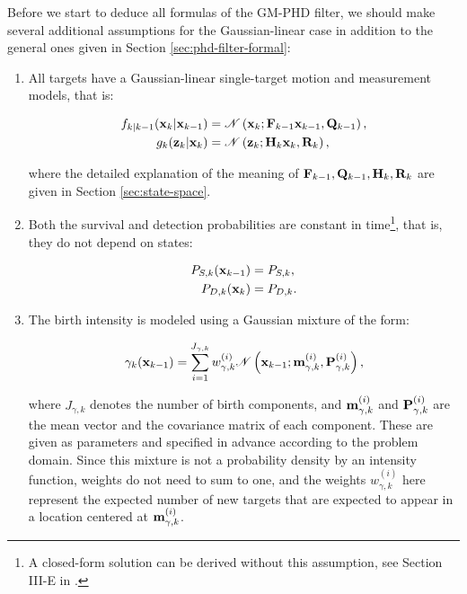 Before we start to deduce all formulas of the GM-PHD filter, we should make several additional assumptions for the Gaussian-linear case in addition to the general ones given in Section \ref{sec:phd-filter-formal}:

\begin{enumerate}
    \item All targets have a Gaussian-linear single-target motion and measurement models, that is:

    \begin{align}
        f_{k|k-1}(\vecat{x}{k} | \vecat{x}{k-1}) &= \mathscr{N}\left(\vecat{x}{k}; \vecat{F}{k-1} \vecat{x}{k-1}, \vecat{Q}{k-1}\right), \\
        g_{k}(\vecat{z}{k} | \vecat{x}{k}) &= \mathscr{N}\left(\vecat{z}{k}; \vecat{H}{k}\vecat{x}{k}, \vecat{R}{k}\right),
    \end{align}

    \noindent where the detailed explanation of the meaning of $\vecat{F}{k-1}, \vecat{Q}{k-1}, \vecat{H}{k}, \vecat{R}{k}$ are given in Section \ref{sec:state-space}.
    
    \item Both the survival and detection probabilities are constant in time\footnote{A closed-form solution can be derived without this assumption, see Section III-E in \cite{voGaussianMixtureProbability2006}.}, that is, they do not depend on states:

    \begin{align}
        P_{S, k}(\vecat{x}{k-1}) &= P_{S, k},\\
        P_{D, k}(\vecat{x}{k}) &= P_{D, k}.
    \end{align}

    \item The birth intensity is modeled using a Gaussian mixture of the form:

    \begin{equation}\label{eq:gm-phd-birth-gm}
        \gamma_k(\vecat{x}{k-1}) = \sum_{i=1}^{J_{\gamma, k}} w_{\gamma, k}^{(i)}
        \mathscr{N}\left(\vecat{x}{k-1}; \vecat{m}{\gamma, k}^{(i)}, \vecat{P}{\gamma, k}^{(i)}\right),
    \end{equation}

    \noindent where $J_{\gamma, k}$ denotes the number of birth components, and $\vecat{m}{\gamma, k}^{(i)}$ and $\vecat{P}{\gamma, k}^{(i)}$ are the mean vector and the covariance matrix of each component. These are given as parameters and specified in advance according to the problem domain. Since this mixture is not a probability density by an intensity function, weights do not need to sum to one, and the weights $w_{\gamma, k}^{(i)}$ here represent the expected number of new targets that are expected to appear in a location centered at $\vecat{m}{\gamma, k}^{(i)}$.
\end{enumerate}

